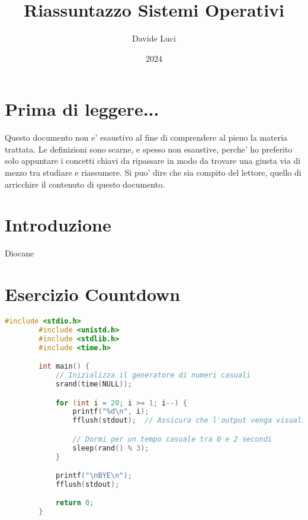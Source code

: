 \documentclass{article}
\title{Riassuntazzo Sistemi Operativi}
\author{Davide Luci}
\date{2024}
\begin{document}
    \maketitle
    \tableofcontents
    \newpage


    \setlength{\parindent}{0pt}
    \section{ Prima di leggere...}
    Questo documento non e' esaustivo al fine di comprendere al pieno la materia trattata.
    Le definizioni sono scarne, e spesso non esaustive, perche' ho preferito solo appuntare i concetti chiavi
    da ripassare in modo da trovare una giusta via di mezzo tra studiare e riassumere. Si puo' dire che sia compito del 
    lettore, quello di arricchire il contenuto di questo documento.

    \newpage

    \section*{ Introduzione}
    Diocane

    \section { Esercizio Countdown}
    \begin{lstlisting}[language=c]
        #include <stdio.h>
        #include <unistd.h>
        #include <stdlib.h>
        #include <time.h>

        int main() {
            // Inizializza il generatore di numeri casuali
            srand(time(NULL));

            for (int i = 20; i >= 1; i--) {
                printf("%d\n", i);
                fflush(stdout);  // Assicura che l'output venga visualizzato immediatamente

                // Dormi per un tempo casuale tra 0 e 2 secondi
                sleep(rand() % 3);
            }

            printf("\nBYE\n");
            fflush(stdout);

            return 0;
        }
    \end{lstlisting}
    
    
\end{document}
